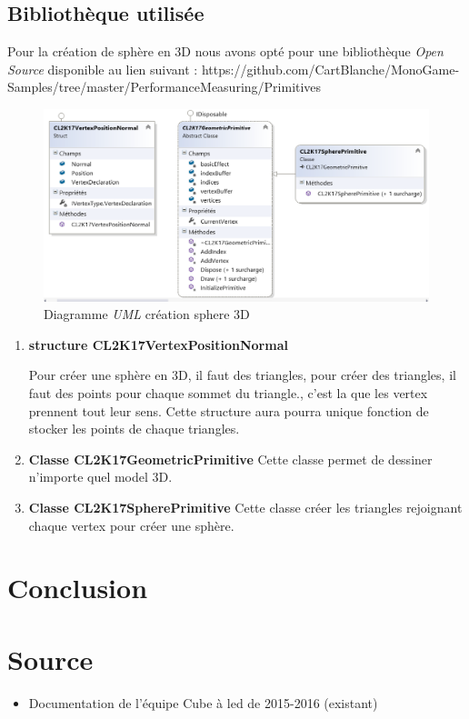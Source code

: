 \documentclass[a4paper,12pt]{article}
\begin{document}
\subsection{Bibliothèque utilisée}

Pour la création de sphère en 3D nous avons opté pour une bibliothèque \emph{Open Source} disponible au lien suivant : https://github.com/CartBlanche/MonoGame-Samples/tree/master/PerformanceMeasuring/Primitives \\

\begin{figure}[htp]
	\centering
	\includegraphics[width=15cm]{./img/diagrammeUmlPrimitive.png}
	\caption{Diagramme \emph{UML} création sphere 3D}
	\label{uml_clcl}
\end{figure}

\begin{enumerate}
    \item \textbf{structure CL2K17VertexPositionNormal}
    
    Pour créer une sphère en 3D, il faut des triangles, pour créer des triangles, il faut des points pour chaque sommet du triangle., c'est la que les vertex prennent tout leur sens. Cette structure aura pourra unique fonction de stocker les points de chaque triangles.
    
    \item \textbf{Classe CL2K17GeometricPrimitive}
    Cette classe permet de dessiner n'importe quel model 3D.
    
    \item \textbf{Classe CL2K17SpherePrimitive}
    Cette classe créer les triangles rejoignant chaque vertex pour créer une sphère.
\end{enumerate}

\newpage

\section{Conclusion}

\newpage

\section{Source}
\begin{itemize}
	\item Documentation de l'équipe Cube à led de 2015-2016 (existant)
\end{itemize}

\newpage
\listoffigures
\end{document}
